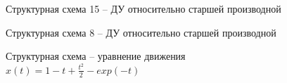 \documentclass[12pt]{article}
\begin{document}
	\begin{figure}[h]
	\caption{Структурная схема 15 -- ДУ относительно старшей производной}
\end{figure}

\begin{figure}[h]
	\caption{Структурная схема 8 -- ДУ относительно старшей производной}
\end{figure}


	\begin{figure}[h]
		\caption{Структурная схема -- уравнение движения $x(t)=1-t+\frac{t^{2}}{2}-exp(-t)$}
	\end{figure}
\end{document}
